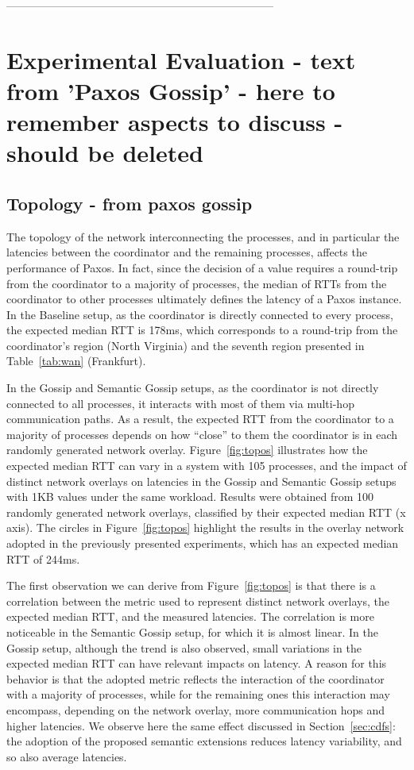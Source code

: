 
\newpage 

------------------------------------------------------------------------


\section{Experimental Evaluation - text from 'Paxos Gossip' - here to remember aspects to discuss - should be deleted}
\subsection{Topology - from paxos gossip}

The topology of the network interconnecting the processes,
and in particular the latencies between the coordinator and the remaining processes, 
affects the performance of Paxos.
In fact, since the decision of a value requires a round-trip from the
coordinator to a majority of processes, the median of RTTs from the coordinator
to other processes ultimately defines the latency of a Paxos instance.
In the Baseline setup, as the coordinator is directly connected to every process,
the expected median RTT is 178ms, which corresponds to a round-trip from the
coordinator's region (North Virginia) and the seventh region presented in
Table~\ref{tab:wan} (Frankfurt).

In the Gossip and Semantic Gossip setups, as the coordinator is not directly
connected to all processes, it interacts with most of them via multi-hop
communication paths.
As a result, the expected RTT from the coordinator to a majority of processes
depends on how ``close'' to them the coordinator is in each randomly generated
network overlay.
%
Figure~\ref{fig:topos} illustrates how the expected median RTT can vary in a
system with 105 processes, and the impact of distinct network overlays on
latencies in the Gossip and Semantic Gossip setups with 1KB values under the
same workload.
Results were obtained from 100 randomly generated network overlays, classified
by their expected median RTT (x axis).
The circles in Figure~\ref{fig:topos} highlight the results in the overlay
network adopted in the previously presented experiments, which has an expected
median RTT of 244ms. 



The first observation we can derive from Figure~\ref{fig:topos} is that there
is a correlation between the metric used to represent distinct network
overlays, the expected median RTT, and the measured latencies.
The correlation is more noticeable in the Semantic Gossip setup, for which it
is almost linear.
%
In the Gossip setup, although the trend is also observed, small variations in
the expected median RTT can have relevant impacts on latency.
%
A reason for this behavior is that the adopted metric reflects the
interaction of the coordinator with a majority of processes, while for the
remaining ones this interaction may encompass, depending on the network
overlay, more communication hops and higher latencies.
We observe here the same effect discussed in Section~\ref{sec:cdfs}: the
adoption of the proposed semantic extensions reduces latency variability, and
so also average latencies.

